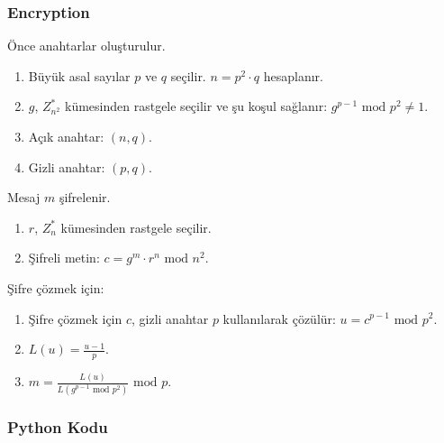 \subsubsection{Encryption}

Önce anahtarlar oluşturulur.

\begin{enumerate}
    \item Büyük asal sayılar $p$ ve $q$ seçilir. $n = p^{2} \cdot q$ hesaplanır.
    \item $g$, $Z_{n^2}^{*}$ kümesinden rastgele seçilir ve şu koşul sağlanır: $g^{p-1} \text{ mod } p^2 \neq 1$.
    \item Açık anahtar: $(n, q)$.
    \item Gizli anahtar: $(p, q)$. 
\end{enumerate}

Mesaj $m$ şifrelenir.

\begin{enumerate}
    \item $r$, $Z_{n}^{*}$ kümesinden rastgele seçilir.
    \item Şifreli metin: $c = g^m \cdot r^n \text{ mod } n^2$.
\end{enumerate}

Şifre çözmek için:

\begin{enumerate}
    \item Şifre çözmek için $c$, gizli anahtar $p$ kullanılarak çözülür: $u = c^{p-1} \text{ mod } p^2$.
    \item $L(u) = \frac{u - 1}{p}$.
    \item $m = \frac{L(u)}{L(g^{p-1} \text{ mod } p^2)} \text{ mod } p$.
\end{enumerate}

\subsubsection{Python Kodu}

